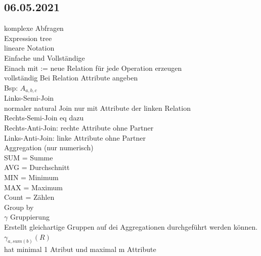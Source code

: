 \documentclass{article}
\begin{document}
	\subsection*{06.05.2021}
	komplexe Abfragen \\
	Expression tree \\
	lineare Notation \\
	Einfache und Vollständige \\
	Einach mit := neue Relation für jede Operation erzeugen \\
	vollständig Bei Relation Attribute angeben  \\
	Bsp: $A_{a,b,c}$ \\
	Links-Semi-Join \\
	normaler natural Join nur mit Attribute der linken Relation \\
	Rechts-Semi-Join eq dazu \\
	Rechts-Anti-Join: rechte Attribute ohne Partner \\
	Links-Anti-Join: linke Attribute ohne Partner \\
	Aggregation (nur numerisch) \\
	SUM = Summe \\
	AVG = Durchschnitt \\
	MIN = Minimum \\
	MAX = Maximum \\
	Count = Zählen \\
	Group by \\
	$\gamma$ Gruppierung \\
	Erstellt gleichartige Gruppen auf dei Aggregationen durchgeführt werden können. \\
	$\gamma_{a, sum(b)}(R)$ \\
	hat minimal 1 Atribut und maximal m Attribute \\
\end{document}
